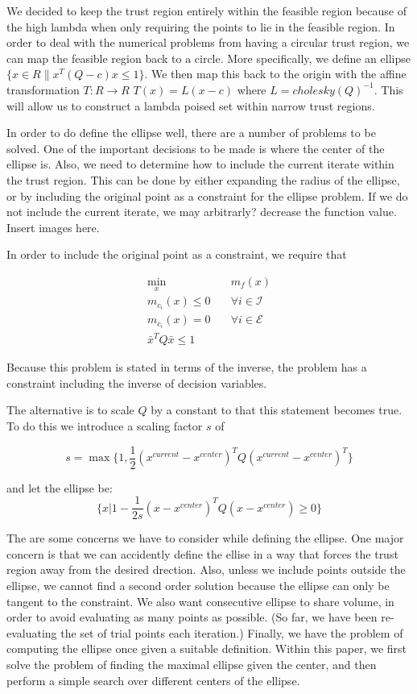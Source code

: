 \documentclass{article}
\begin{document}
We decided to keep the trust region entirely within the feasible region because of the high lambda when only requiring the points to lie in the feasible region.
In order to deal with the numerical problems from having a circular trust region, we can map the feasible region back to a circle.
More specifically, we define an ellipse $\{x \in R \| x^T (Q - c) x \le 1 \}$.
We then map this back to the origin with the affine transformation $T : R \to R$ $T(x) = L(x-c)$ where $L = cholesky(Q)^{-1}$.
This will allow us to construct a lambda poised set within narrow trust regions.


In order to do define the ellipse well, there are a number of problems to be solved.
One of the important decisions to be made is where the center of the ellipse is.
Also, we need to determine how to include the current iterate within the trust region.
This can be done by either expanding the radius of the ellipse, or by including the original point as a constraint for the ellipse problem.
If we do not include the current iterate, we may arbitrarly? decrease the function value.
Insert images here.

In order to include the original point as a constraint, we require that


\begin{center}
\begin{align}
\label{problem}
\min_x & \quad m_f(x) \\
  m_{c_i}(x) \le 0   & \quad \forall i \in \mathcal {I} \nonumber \\
  m_{c_i}(x)  = 0    & \quad \forall i \in \mathcal {E} \nonumber \\
  \bar{x}^T Q \bar{x} \le 1
\end{align}
\end{center}

Because this problem is stated in terms of the inverse, the problem has a constraint including the inverse of decision variables.

The alternative is to scale $Q$ by a constant to that this statement becomes true.
To do this we introduce a scaling factor $s$ of

$$ s = \max \{1, \frac 1 {2} (x^{current} - x^{center})^T Q (x^{current} - x^{center})^T \}$$

and let the ellipse be:
$$\{x | 1 - \frac 1 {2s} (x - x^{center})^T Q (x - x^{center}) \ge 0\} $$


The are some concerns we have to consider while defining the ellipse.
One major concern is that we can accidently define the ellise in a way that forces the trust region away from the desired drection.
Also, unless we include points outside the ellipse, we cannot find a second order solution because the ellipse can only be tangent to the constraint.
We also want consecutive ellipse to share volume, in order to avoid evaluating as many points as possible.
(So far, we have been re-evaluating the set of trial points each iteration.)
Finally, we have the problem of computing the ellipse once given a suitable definition.
Within this paper, we first solve the problem of finding the maximal ellipse given the center, and then perform a simple search over different centers of the ellipse.
\end{document}
